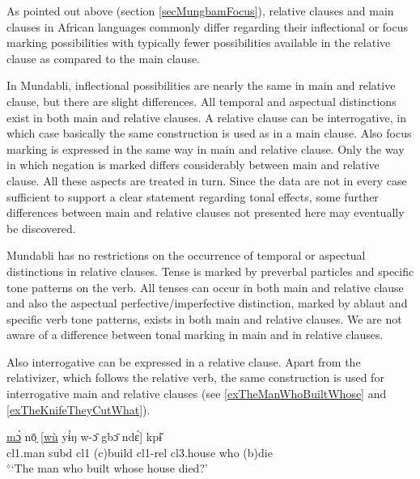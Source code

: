 \documentclass[10pt,twoside]{article}
\def\ci#1{{\ipaFont #1}}
\newcommand{\gl}[1]{`#1'}
\def\VSP{\vspace{0pt}}
\newcommand{\cl}[1]{{\sc cl#1}}
\def\elicited{$^\diamond$}
\begin{document}
As pointed out above (section \ref{secMungbamFocus}), relative clauses and main clauses in African languages commonly 
differ regarding their inflectional or focus marking possibilities with typically fewer possibilities available in 
the relative clause as compared to the main clause.

In Mundabli, inflectional possibilities are nearly the same in main and relative clause, but there are 
slight differences. All temporal and aspectual distinctions exist in both main and relative clauses. A relative 
clause can be interrogative, in which case basically the same construction is used as in a main clause. 
Also focus marking is expressed in the same way in main and relative clause. Only the way in which negation 
is marked differs considerably between main and relative clause. All these aspects are treated in turn. 
Since the 
data are not in every case sufficient to support a clear statement regarding tonal effects,
some further differences between main and relative clauses not presented here may eventually be
discovered.

Mundabli has no restrictions on the occurrence of temporal or aspectual distinctions in relative clauses. Tense is marked by preverbal particles and specific tone patterns on the verb. All tenses can occur in both main and relative clause and also the aspectual perfective/imperfective distinction, marked by ablaut and specific verb tone patterns, exists in both main and relative clauses. We are not aware of a difference between tonal marking in main and in relative clauses. 

Also interrogative can be expressed in a relative clause. Apart from the relativizer, which follows the relative verb, the same construction is 
used for interrogative main and relative clauses (see \ref{exTheManWhoBuiltWhose} and \ref{exTheKnifeTheyCutWhat}).

\begin{exe} 
	\ex \label{exTheManWhoBuiltWhose}	

		\gll \uline{mɔ̀} nō̤ [\uline{wù} yɨ́ŋ w-ɔ̄ gbɔ̄ ndɛ́] kpɨ̌			\\
		\cl1.man {\sc subd} \cl1  ({\sc c})build \cl1-{\sc rel} \cl3.house who ({\sc b})die	\\
		\glt \VSP \elicited \gl{The man who built whose house died?}

\end{exe}%
\end{document}
